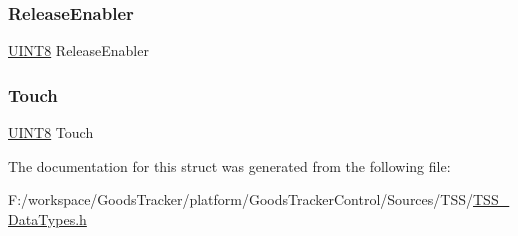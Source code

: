 \subsubsection{\texorpdfstring{Release\+Enabler}{ReleaseEnabler}}
{\footnotesize\ttfamily \hyperlink{_t_s_s___data_types_8h_ab27e9918b538ce9d8ca692479b375b6a}{U\+I\+N\+T8} Release\+Enabler}

\mbox{\label{struct_t_s_s___m_a_t_r_i_x___e_v_e_n_t_s_af14847cac91c6738b89713699d9b9c75}} 
\subsubsection{\texorpdfstring{Touch}{Touch}}
{\footnotesize\ttfamily \hyperlink{_t_s_s___data_types_8h_ab27e9918b538ce9d8ca692479b375b6a}{U\+I\+N\+T8} Touch}



The documentation for this struct was generated from the following file\+:\begin{DoxyCompactItemize}
\item 
F\+:/workspace/\+Goods\+Tracker/platform/\+Goods\+Tracker\+Control/\+Sources/\+T\+S\+S/\hyperlink{_t_s_s___data_types_8h}{T\+S\+S\+\_\+\+Data\+Types.\+h}\end{DoxyCompactItemize}

